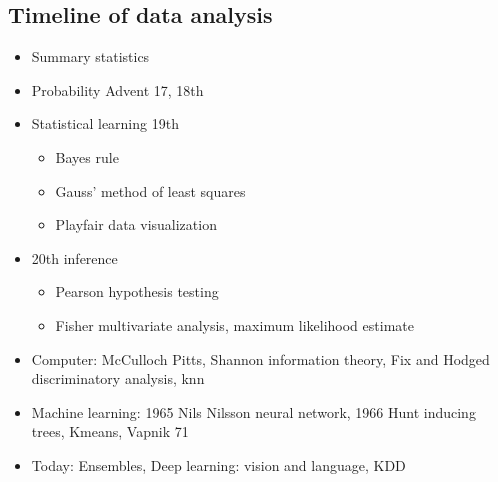 \subsection{Timeline of data analysis}

\begin{itemize}
  \item Summary statistics
  \item Probability Advent 17, 18th
  \item Statistical learning 19th
    \begin{itemize}
      \item Bayes rule
      \item Gauss’ method of least squares
      \item Playfair data visualization
    \end{itemize}
  \item 20th inference
    \begin{itemize}
      \item Pearson hypothesis testing
      \item Fisher multivariate analysis, maximum likelihood estimate
    \end{itemize}
  \item Computer: McCulloch Pitts, Shannon information theory, Fix and Hodged discriminatory analysis, knn
  \item Machine learning: 1965 Nils Nilsson neural network, 1966 Hunt inducing trees, Kmeans, Vapnik 71
  \item Today: Ensembles, Deep learning: vision and language, KDD
\end{itemize}
